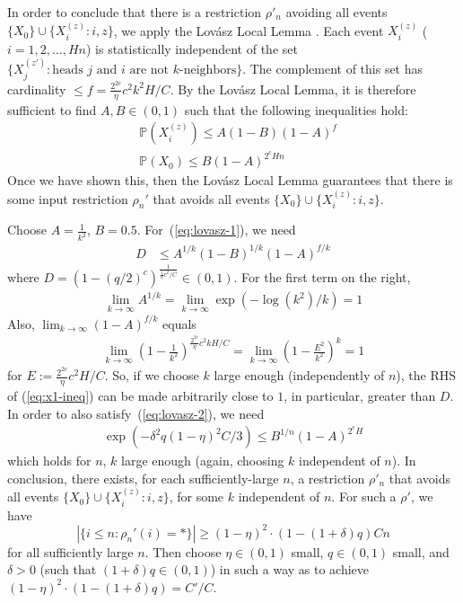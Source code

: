 \documentclass[11pt,a4paper]{article}
\newcommand{\Prob}{\mathbb{P}}%
\begin{document}
In order to conclude that there is a restriction $\rho'_n$ avoiding all events $\{X_0\} \cup \{X_i^{(z)} : i, z\}$, we apply the Lov{\'a}sz Local Lemma \cite[Theorem 6.17]{mitzenmacherprobability}.
Each event $X_i^{(z)}$ ($i=1,2,\dots, Hn$) is statistically independent of the set $\{X_j^{(z')} : \text{heads } j \text{ and } i \text{ are not $k$-neighbors}\}$.
The complement of this set has cardinality $\leq f= \frac{2^{2c}}{\eta}c^2k^2H/C$.
By the Lov{\'a}sz Local Lemma, it is therefore sufficient to find  $A, B \in (0,1)$ such that the following inequalities hold: %
\begin{align}\label{eq:lovasz-1}
&\Prob(X_i^{(z)}) \leq A(1-B)(1-A)^{f} \\ \label{eq:lovasz-2}
&\Prob(X_0)  \leq B (1-A)^{2^cHn}
\end{align}
Once we have shown this, then the Lov{\'a}sz Local Lemma guarantees that there is some input restriction $\rho_n'$ that avoids all events $\{X_0\} \cup \{X_i^{(z)} : i, z\}$.


Choose 
$A=\frac{1}{k^2}$, $B=0.5$.
For~(\ref{eq:lovasz-1}), we need
\begin{align}\label{eq:x1-ineq}
    D &\leq A^{1/k}(1-B)^{1/k}(1-A)^{f/k} 
\end{align}
where $D =  \left(1-(q/2)^c\right)^{\frac{1}{\frac{1}{\eta}c^2/C}} \in (0,1)$.
For the first term on the right, 
\begin{align*}
\lim_{k\rightarrow \infty} A^{1/k} = \lim_{k\rightarrow \infty} \exp\left(-\log(k^2) / k\right) = 1
\end{align*}
Also, $\lim_{k\rightarrow \infty} (1-A)^{f/k}$ equals
\begin{align*}
\lim_{k\rightarrow \infty} \left(1-\frac{1}{k^2}\right)^{\frac{2^{2c}}{\eta}c^2kH/C} = \lim_{k\rightarrow \infty} \left(1-\frac{E^2}{k^2}\right)^{k} = 1
\end{align*}
for $E := \frac{2^{2c}}{\eta}c^2H/C$. So, if we choose $k$ large enough (independently of $n$), the RHS of (\ref{eq:x1-ineq}) can be made arbitrarily close to $1$, in particular, greater than $D$.
In order to also satisfy~(\ref{eq:lovasz-2}), we need
\begin{align*}
\exp\left(-\delta^2q(1-\eta)^2C/3\right)  \leq B^{1/n} (1-A)^{2^c H}
\end{align*}
which holds for $n$, $k$ large enough (again, choosing $k$ independent of $n$). 
In conclusion, there exists, for each sufficiently-large $n$, a restriction $\rho'_n$ that avoids all events $\{X_0\} \cup \{X_i^{(z)} : i, z\}$, for some $k$ independent of $n$.
For such a $\rho'$, we have
\begin{equation*}
|\{i \leq n: \rho_n'(i) = *\}|\geq (1-\eta)^2\cdot (1-(1+\delta)q) C n
\end{equation*}
for all sufficiently large $n$.
Then choose $\eta \in (0,1)$ small, $q \in (0,1)$ small, and $\delta >0$ (such that $(1+\delta)q \in (0,1)$) in such a way as to achieve $(1-\eta)^2\cdot (1-(1+\delta)q) = C'/C$.
\end{document}
